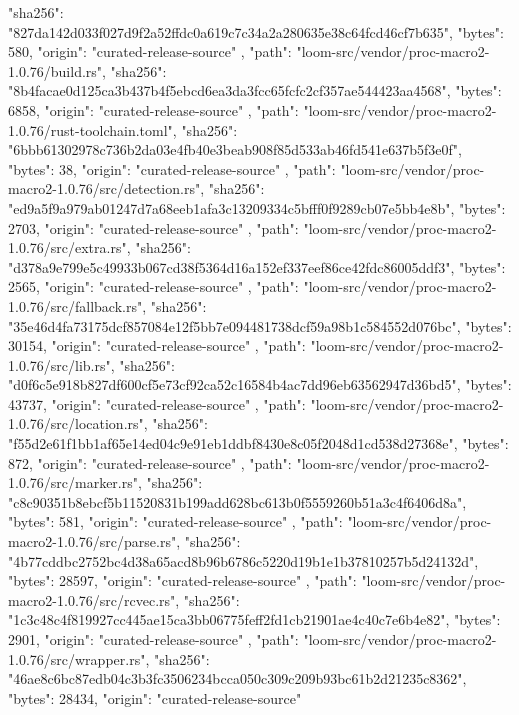 {{      "sha256": "827da142d033f027d9f2a52ffdc0a619c7c34a2a280635e38c64fcd46cf7b635",
      "bytes": 580,
      "origin": "curated-release-source"
    },
    {
      "path": "loom-src/vendor/proc-macro2-1.0.76/build.rs",
      "sha256": "8b4facae0d125ca3b437b4f5ebcd6ea3da3fcc65fcfc2cf357ae544423aa4568",
      "bytes": 6858,
      "origin": "curated-release-source"
    },
    {
      "path": "loom-src/vendor/proc-macro2-1.0.76/rust-toolchain.toml",
      "sha256": "6bbb61302978c736b2da03e4fb40e3beab908f85d533ab46fd541e637b5f3e0f",
      "bytes": 38,
      "origin": "curated-release-source"
    },
    {
      "path": "loom-src/vendor/proc-macro2-1.0.76/src/detection.rs",
      "sha256": "ed9a5f9a979ab01247d7a68eeb1afa3c13209334c5bfff0f9289cb07e5bb4e8b",
      "bytes": 2703,
      "origin": "curated-release-source"
    },
    {
      "path": "loom-src/vendor/proc-macro2-1.0.76/src/extra.rs",
      "sha256": "d378a9e799e5c49933b067cd38f5364d16a152ef337eef86ce42fdc86005ddf3",
      "bytes": 2565,
      "origin": "curated-release-source"
    },
    {
      "path": "loom-src/vendor/proc-macro2-1.0.76/src/fallback.rs",
      "sha256": "35e46d4fa73175dcf857084e12f5bb7e094481738dcf59a98b1c584552d076bc",
      "bytes": 30154,
      "origin": "curated-release-source"
    },
    {
      "path": "loom-src/vendor/proc-macro2-1.0.76/src/lib.rs",
      "sha256": "d0f6c5e918b827df600cf5e73cf92ca52c16584b4ac7dd96eb63562947d36bd5",
      "bytes": 43737,
      "origin": "curated-release-source"
    },
    {
      "path": "loom-src/vendor/proc-macro2-1.0.76/src/location.rs",
      "sha256": "f55d2e61f1bb1af65e14ed04c9e91eb1ddbf8430e8c05f2048d1cd538d27368e",
      "bytes": 872,
      "origin": "curated-release-source"
    },
    {
      "path": "loom-src/vendor/proc-macro2-1.0.76/src/marker.rs",
      "sha256": "c8c90351b8ebcf5b11520831b199add628bc613b0f5559260b51a3c4f6406d8a",
      "bytes": 581,
      "origin": "curated-release-source"
    },
    {
      "path": "loom-src/vendor/proc-macro2-1.0.76/src/parse.rs",
      "sha256": "4b77cddbc2752bc4d38a65acd8b96b6786c5220d19b1e1b37810257b5d24132d",
      "bytes": 28597,
      "origin": "curated-release-source"
    },
    {
      "path": "loom-src/vendor/proc-macro2-1.0.76/src/rcvec.rs",
      "sha256": "1c3c48c4f819927cc445ae15ca3bb06775feff2fd1cb21901ae4c40c7e6b4e82",
      "bytes": 2901,
      "origin": "curated-release-source"
    },
    {
      "path": "loom-src/vendor/proc-macro2-1.0.76/src/wrapper.rs",
      "sha256": "46ae8c6bc87edb04c3b3fc3506234bcca050c309c209b93bc61b2d21235c8362",
      "bytes": 28434,
      "origin": "curated-release-source"
}}
